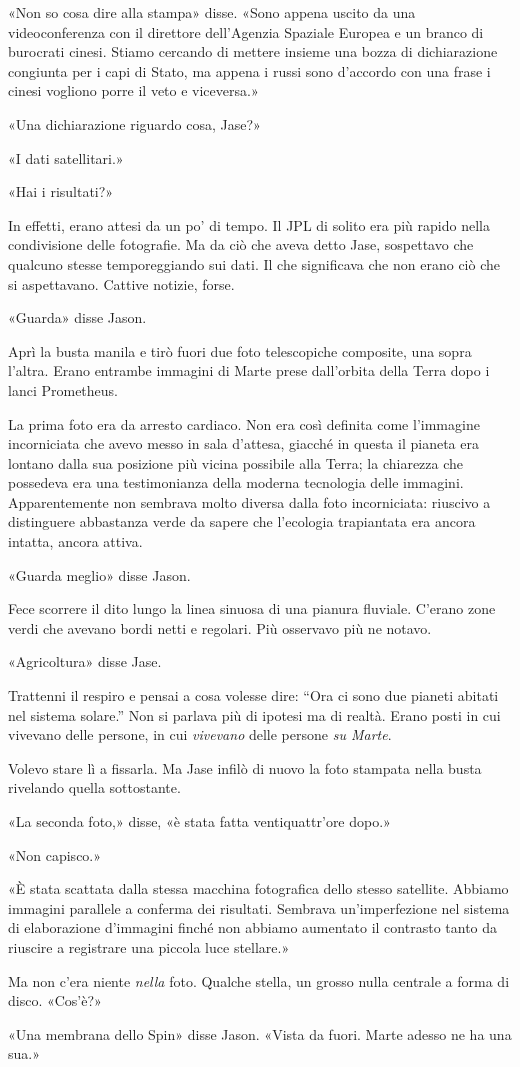 «Non so cosa dire alla stampa» disse. «Sono appena uscito da una
videoconferenza con il direttore dell'Agenzia Spaziale Europea e un
branco di burocrati cinesi. Stiamo cercando di mettere insieme una bozza
di dichiarazione congiunta per i capi di Stato, ma appena i russi sono
d'accordo con una frase i cinesi vogliono porre il veto e viceversa.»

«Una dichiarazione riguardo cosa, Jase?»

«I dati satellitari.»

«Hai i risultati?»

In effetti, erano attesi da un po' di tempo. Il JPL di solito era più
rapido nella condivisione delle fotografie. Ma da ciò che aveva detto
Jase, sospettavo che qualcuno stesse temporeggiando sui dati. Il che
significava che non erano ciò che si aspettavano. Cattive notizie,
forse.

«Guarda» disse Jason.

Aprì la busta manila e tirò fuori due foto telescopiche composite, una
sopra l'altra. Erano entrambe immagini di Marte prese dall'orbita della
Terra dopo i lanci Prometheus.

La prima foto era da arresto cardiaco. Non era così definita come
l'immagine incorniciata che avevo messo in sala d'attesa, giacché in
questa il pianeta era lontano dalla sua posizione più vicina possibile
alla Terra; la chiarezza che possedeva era una testimonianza della
moderna tecnologia delle immagini. Apparentemente non sembrava molto
diversa dalla foto incorniciata: riuscivo a distinguere abbastanza verde
da sapere che l'ecologia trapiantata era ancora intatta, ancora attiva.

«Guarda meglio» disse Jason.

Fece scorrere il dito lungo la linea sinuosa di una pianura fluviale.
C'erano zone verdi che avevano bordi netti e regolari. Più osservavo più
ne notavo.

«Agricoltura» disse Jase.

Trattenni il respiro e pensai a cosa volesse dire: ``Ora ci sono due
pianeti abitati nel sistema solare.'' Non si parlava più di ipotesi ma
di realtà. Erano posti in cui vivevano delle persone, in cui
\emph{vivevano} delle persone \emph{su Marte}.

Volevo stare lì a fissarla. Ma Jase infilò di nuovo la foto stampata
nella busta rivelando quella sottostante.

«La seconda foto,» disse, «è stata fatta ventiquattr'ore dopo.»

«Non capisco.»

«È stata scattata dalla stessa macchina fotografica dello stesso
satellite. Abbiamo immagini parallele a conferma dei risultati. Sembrava
un'imperfezione nel sistema di elaborazione d'immagini finché non
abbiamo aumentato il contrasto tanto da riuscire a registrare una
piccola luce stellare.»

Ma non c'era niente \emph{nella} foto. Qualche stella, un grosso nulla
centrale a forma di disco. «Cos'è?»

«Una membrana dello Spin» disse Jason. «Vista da fuori. Marte adesso ne
ha una sua.»
